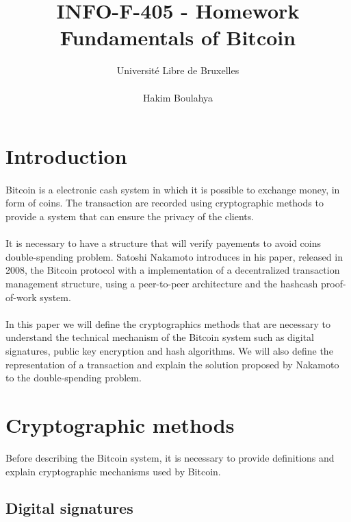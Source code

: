 \documentclass[letterpaper]{article}
\title{INFO-F-405 - Homework \\ Fundamentals of Bitcoin}
\author{Université Libre de Bruxelles \\
\\ Hakim Boulahya}
\begin{document}
\maketitle


\section*{Introduction}

\paragraph{}
Bitcoin is a electronic cash system in which it is possible to exchange
money, in form of coins.
The transaction are recorded
using cryptographic methods to provide a system that
can ensure the privacy of the clients.

\paragraph{}
It is necessary to have a structure that will verify payements to
avoid coins double-spending problem. Satoshi Nakamoto introduces
in his paper\cite{bitcoin}, released in 2008, the Bitcoin protocol
with a implementation of a decentralized transaction management structure,
using a peer-to-peer architecture and the hashcash\cite{hashcash}
proof-of-work system.

\paragraph{}
In this paper we will define the cryptographics methods that are necessary
to understand the technical mechanism of the Bitcoin system
such as digital signatures,
public key encryption and hash algorithms. We will also define the
representation of a transaction and explain the solution proposed
by Nakamoto\cite{bitcoin} to the double-spending problem.

\section{Cryptographic methods}
Before describing the Bitcoin system, it is necessary to provide definitions
and explain cryptographic mechanisms used by Bitcoin.

\subsection{Digital signatures}
\end{document}
